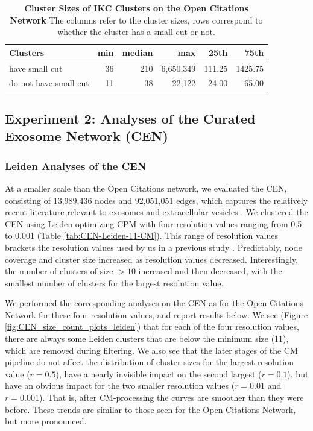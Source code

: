\documentclass[11pt]{article}   	%
\begin{document}
\begin{table}[ht]
\centering
\begin{tabular}{lrrrrr}
    \hline
Clusters              & min & median & max    & 25th    & 75th    \\
    \hline
have small cut    & 36  & 210    & 6,650,349 & 111.25 & 1425.75 \\
do not have small cut & 11  & 38     & 22,122  & 24.00     & 65.00         \\
    \hline
\end{tabular}
\caption[Cluster Sizes of IKC Clusters on the Open Citations Network]{\textbf{ Cluster Sizes of IKC Clusters on the Open Citations Network}  The columns refer to the  cluster sizes, rows correspond to whether the cluster has a small cut or not.}
\label{tab:IKC-OC-sizes}
\end{table}

\clearpage
\subsection{Experiment 2: Analyses of the Curated Exosome Network (CEN)}

\subsubsection{Leiden Analyses of the CEN}

At a smaller scale than the Open Citations network, we evaluated the CEN, consisting of 13,989,436 nodes and 92,051,051 edges, which captures the relatively recent literature relevant to exosomes and extracellular vesicles \citep{van2022challenges}. We clustered the CEN using Leiden optimizing CPM with  four resolution values ranging from 0.5 to 0.001 (Table \ref{tab:CEN-Leiden-11-CM}).
This range of resolution values brackets the resolution values used by us in a previous study \citep{Jakatdar_2022}. Predictably, node coverage and cluster size increased as resolution values  decreased. Interestingly, the number of clusters of size $>10$ increased and then decreased, with the smallest number of clusters for the largest resolution value.

We performed the corresponding analyses on the CEN as for the Open Citations Network for these four resolution values, and report results below.
We see (Figure \ref{fig:CEN_size_count_plots_leiden}) that  for each of the four resolution values, there are always some Leiden clusters  that are below
the minimum size (11), which are removed during filtering. We also see that  the later stages of the CM pipeline do not affect the distribution of cluster sizes for the
largest resolution value ($r=0.5$), have a nearly invisible impact on the second largest ($r=0.1$), but have an obvious impact for the two smaller resolution values
($r=0.01$ and $r=0.001$).
That is, after CM-processing the curves are smoother than they were before.
These trends are similar to those seen for the Open Citations Network, but more pronounced.
\end{document}
